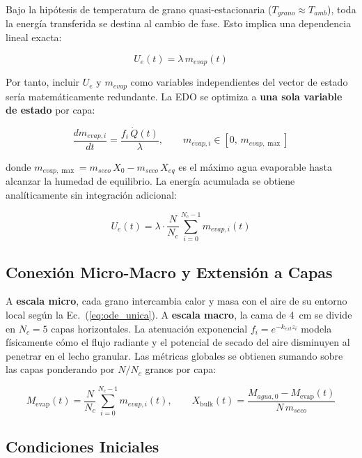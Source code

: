 \documentclass[conference]{IEEEtran}
\begin{document}
Bajo la hipótesis de temperatura de grano quasi-estacionaria ($T_{grano} \approx T_{amb}$), toda la energía transferida se destina al cambio de fase. Esto implica una dependencia lineal exacta:

\begin{equation}
U_e(t) = \lambda\,m_{evap}(t)
\label{eq:dependencia_lineal}
\end{equation}

Por tanto, incluir $U_e$ y $m_{evap}$ como variables independientes del vector de estado sería matemáticamente redundante. La EDO se optimiza a \textbf{una sola variable de estado} por capa:

\begin{equation}
\boxed{
\frac{dm_{evap,i}}{dt}
=
\frac{f_i\,\dot{Q}(t)}{\lambda},
\qquad
m_{evap,i} \in [0,\, m_{evap,\max}]
}
\label{eq:ode_unica}
\end{equation}

donde $m_{evap,\max} = m_{seco}\,X_0 - m_{seco}\,X_{eq}$ es el máximo agua evaporable hasta alcanzar la humedad de equilibrio. La energía acumulada se obtiene analíticamente sin integración adicional:

\begin{equation}
U_e(t) = \lambda \cdot \frac{N}{N_c} \sum_{i=0}^{N_c-1} m_{evap,i}(t)
\label{eq:Ue_analitica}
\end{equation}

\subsection{Conexión Micro-Macro y Extensión a Capas}

A \textbf{escala micro}, cada grano intercambia calor y masa con el aire de su entorno local según la Ec.~(\ref{eq:ode_unica}). A \textbf{escala macro}, la cama de 4~cm se divide en $N_c = 5$ capas horizontales. La atenuación exponencial $f_i = e^{-k_{ext}z_i}$ modela físicamente cómo el flujo radiante y el potencial de secado del aire disminuyen al penetrar en el lecho granular. Las métricas globales se obtienen sumando sobre las capas ponderando por $N/N_c$ granos por capa:

\begin{equation}
M_{\text{evap}}(t) = \frac{N}{N_c}\sum_{i=0}^{N_c-1} m_{evap,i}(t),
\qquad
X_{\text{bulk}}(t) = \frac{M_{agua,0} - M_{\text{evap}}(t)}{N\,m_{seco}}
\label{eq:macro}
\end{equation}

\subsection{Condiciones Iniciales}
\end{document}
